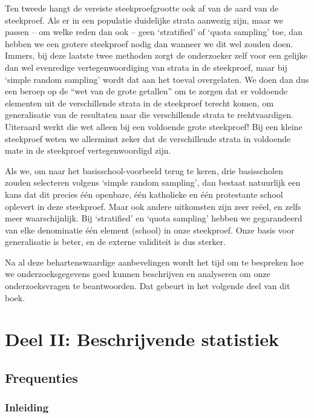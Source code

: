 \documentclass[
]{book}
\begin{document}
Ten tweede hangt de vereiste steekproefgrootte ook af van de aard van de
steekproef. Als er in een populatie duidelijke strata aanwezig zijn,
maar we passen -- om welke reden dan ook -- geen `stratified' of `quota
sampling' toe, dan hebben we een grotere steekproef nodig dan wanneer we
dit wel zouden doen. Immers, bij deze laatste twee methoden zorgt de
onderzoeker zelf voor een gelijke dan wel evenredige vertegenwoordiging
van strata in de steekproef, maar bij `simple random sampling' wordt dat
aan het toeval overgelaten. We doen dan dus een beroep op de ``wet van de
grote getallen'' om te zorgen dat er voldoende elementen uit de
verschillende strata in de steekproef terecht komen, om generalisatie
van de resultaten naar die verschillende strata te rechtvaardigen.
Uiteraard werkt die wet alleen bij een voldoende grote steekproef! Bij
een kleine steekproef weten we allerminst zeker dat de verschillende
strata in voldoende mate in de steekproef vertegenwoordigd zijn.

Als we, om naar het basisschool-voorbeeld terug te keren, drie
basisscholen zouden selecteren volgens `simple random sampling', dan
bestaat natuurlijk een kans dat dit precies één openbare, één katholieke
en één protestante school oplevert in deze steekproef. Maar ook andere
uitkomsten zijn zeer reëel, en zelfs meer waarschijnlijk. Bij
`stratified' en `quota sampling' hebben we gegarandeerd van elke
denominatie één element (school) in onze steekproef. Onze basis voor
generalisatie is beter, en de externe validiteit is dus sterker.

Na al deze behartenswaardige aanbevelingen wordt het tijd om te
bespreken hoe we onderzoeksgegevens goed kunnen beschrijven en
analyseren om onze onderzoeksvragen te beantwoorden. Dat gebeurt in het
volgende deel van dit boek.

\hypertarget{part-deel-ii-beschrijvende-statistiek}{%
\part*{Deel II: Beschrijvende statistiek}\label{part-deel-ii-beschrijvende-statistiek}}

\hypertarget{ch:frequenties}{%
\chapter{Frequenties}\label{ch:frequenties}}

\hypertarget{inleiding-3}{%
\section{Inleiding}\label{inleiding-3}}
\end{document}
